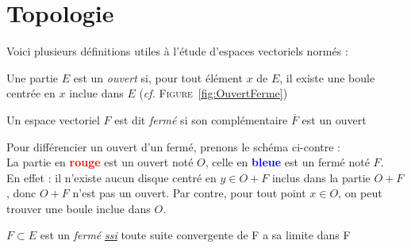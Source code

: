 \documentclass[11pt,a4paper,fleqn,pdftex]{report}
\begin{document}
\section{Topologie} %
\label{sec:topologie}
Voici plusieurs définitions utiles à l'étude d'espaces vectoriels normés :
\begin{dfn}[Ouvert]
Une partie $E$ est un \emph{ouvert} si, pour tout élément $x$ de $E$, il existe une boule centrée en $x$ inclue dans $E$ (\textit{cf. }\textsc{Figure}~\ref{fig:OuvertFerme})
\end{dfn}
\begin{dfn}[Fermé]
Un espace vectoriel $F$ est dit \emph{fermé} si son complémentaire $\overline{F}$ est un ouvert
\end{dfn}
%
\begin{minipage}{0.5\textwidth}
Pour différencier un ouvert d'un fermé, prenons le schéma ci-contre : \\
La partie en \textbf{\textcolor{Red}{rouge}} est un ouvert noté $O$, celle en \textbf{\textcolor{Blue}{bleue}} est un fermé noté $F$.\\
En effet : il n'existe aucun disque centré en $y \in O+F$ inclus dans la partie $O+F$, donc $O+F$ n'est pas un ouvert. Par contre, pour tout point $x \in O$, on peut trouver une boule inclue dans $O$.
\end{minipage}\hspace{6pt}
\begin{minipage}{0.4\textwidth}
\label{fig:OuvertFerme}
\end{minipage}
%
\begin{itheorem}
$F\subset E$ est un \emph{fermé} \uline{\emph{ssi}} toute suite convergente de F a sa limite dans F
\end{itheorem}
\end{document}

